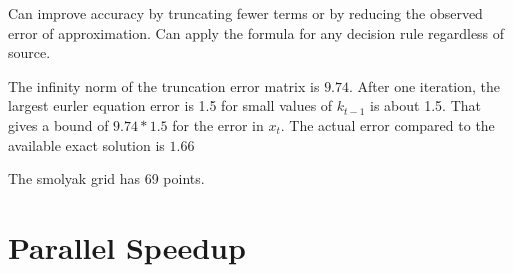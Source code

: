 \documentclass[12pt]{article}
\begin{document}
Can improve accuracy by truncating fewer terms or by reducing the observed 
error of approximation.  Can apply the formula for any decision rule regardless of source.

The infinity norm of the truncation error matrix is $9.74$.  After one iteration, the largest eurler equation error is 1.5 for small values of $k_{t-1}$ is about 1.5.  That gives a bound of $9.74*1.5$ for the error in $x_t$.  The actual error compared to the available exact solution is  $1.66$

The smolyak grid has 69 points.

\section{Parallel Speedup}
\label{sec:parallel-speedup}





  

\end{document}
